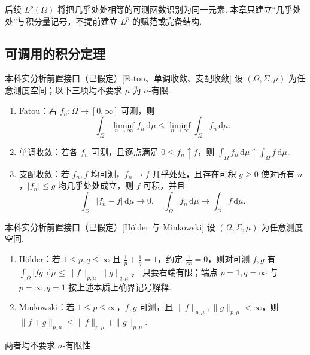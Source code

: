 \begin{FAExample}[几乎处处等价关系的预告]
后续 \(\displaystyle L^p(\Omega)\) 将把几乎处处相等的可测函数识别为同一元素. 本章只建立“几乎处处”与积分量记号，不提前建立 \(\displaystyle L^p\) 的赋范或完备结构.
\end{FAExample}

\subsection{可调用的积分定理}

\begin{FALightBox}{本科实分析前置接口（已假定）}[Fatou、单调收敛、支配收敛]
设 \(\displaystyle (\Omega,\Sigma,\mu)\) 为任意测度空间；以下三项均不要求 \(\displaystyle \mu\) 为 \(\displaystyle \sigma\)-有限.
\begin{enumerate}[label=\textup{(\roman*)}]
\item Fatou：若 \(\displaystyle f_n:\Omega\to[0,\infty]\) 可测，则
\[
\int_\Omega \liminf_{n\to\infty}f_n\,\mathrm{d}\mu
\leqslant
\liminf_{n\to\infty}\int_\Omega f_n\,\mathrm{d}\mu.
\]
\item 单调收敛：若各 \(\displaystyle f_n\) 可测，且逐点满足 \(\displaystyle 0\leqslant f_n\uparrow f\)，则 \(\displaystyle \int_\Omega f_n\,\mathrm{d}\mu\uparrow\int_\Omega f\,\mathrm{d}\mu\).
\item 支配收敛：若 \(\displaystyle f_n,f\) 均可测，\(\displaystyle f_n\to f\) 几乎处处，且存在可积 \(\displaystyle g\geqslant0\) 使对所有 \(\displaystyle n\)，\(\displaystyle |f_n|\leqslant g\) 均几乎处处成立，则 \(\displaystyle f\) 可积，并且
\[
\int_\Omega |f_n-f|\,\mathrm{d}\mu\to0,
\quad
\int_\Omega f_n\,\mathrm{d}\mu\to\int_\Omega f\,\mathrm{d}\mu.
\]
\end{enumerate}
\end{FALightBox}

\begin{FALightBox}{本科实分析前置接口（已假定）}[Hölder 与 Minkowski]
设 \(\displaystyle (\Omega,\Sigma,\mu)\) 为任意测度空间.
\begin{enumerate}[label=\textup{(\roman*)}]
\item Hölder：若 \(\displaystyle 1\leqslant p,q\leqslant\infty\) 且 \(\displaystyle \frac{1}{p}+\frac{1}{q}=1\)，约定 \(\displaystyle \frac{1}{\infty}=0\)，则对可测 \(\displaystyle f,g\) 有 \(\displaystyle \int_\Omega |fg|\,\mathrm{d}\mu \leqslant \|f\|_{p,\mu}\,\|g\|_{q,\mu}\)，
只要右端有限；端点 \(\displaystyle p=1,q=\infty\) 与 \(\displaystyle p=\infty,q=1\) 按上述本质上确界记号解释.
\item Minkowski：若 \(\displaystyle 1\leqslant p\leqslant\infty\)，\(\displaystyle f,g\) 可测，且 \(\displaystyle \|f\|_{p,\mu},\|g\|_{p,\mu}<\infty\)，则 \(\displaystyle \|f+g\|_{p,\mu}\leqslant\|f\|_{p,\mu}+\|g\|_{p,\mu}\).
\end{enumerate}
两者均不要求 \(\displaystyle \sigma\)-有限性.
\end{FALightBox}

